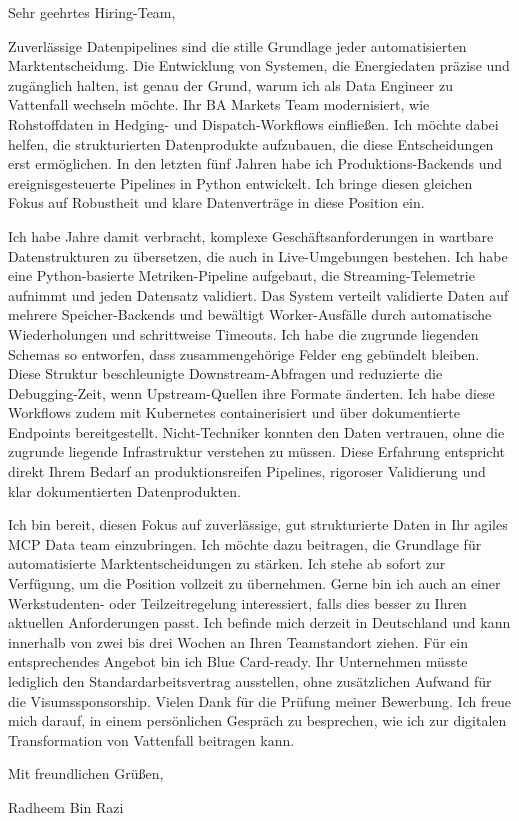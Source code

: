 \documentclass[11pt,a4paper]{coverletter}
\begin{document}

\opening{Sehr geehrtes Hiring-Team,}

Zuverlässige Datenpipelines sind die stille Grundlage jeder automatisierten Marktentscheidung. Die Entwicklung von Systemen, die Energiedaten präzise und zugänglich halten, ist genau der Grund, warum ich als Data Engineer zu Vattenfall wechseln möchte. Ihr BA Markets Team modernisiert, wie Rohstoffdaten in Hedging- und Dispatch-Workflows einfließen. Ich möchte dabei helfen, die strukturierten Datenprodukte aufzubauen, die diese Entscheidungen erst ermöglichen. In den letzten fünf Jahren habe ich Produktions-Backends und ereignisgesteuerte Pipelines in Python entwickelt. Ich bringe diesen gleichen Fokus auf Robustheit und klare Datenverträge in diese Position ein.

Ich habe Jahre damit verbracht, komplexe Geschäftsanforderungen in wartbare Datenstrukturen zu übersetzen, die auch in Live-Umgebungen bestehen. Ich habe eine Python-basierte Metriken-Pipeline aufgebaut, die Streaming-Telemetrie aufnimmt und jeden Datensatz validiert. Das System verteilt validierte Daten auf mehrere Speicher-Backends und bewältigt Worker-Ausfälle durch automatische Wiederholungen und schrittweise Timeouts. Ich habe die zugrunde liegenden Schemas so entworfen, dass zusammengehörige Felder eng gebündelt bleiben. Diese Struktur beschleunigte Downstream-Abfragen und reduzierte die Debugging-Zeit, wenn Upstream-Quellen ihre Formate änderten. Ich habe diese Workflows zudem mit Kubernetes containerisiert und über dokumentierte Endpoints bereitgestellt. Nicht-Techniker konnten den Daten vertrauen, ohne die zugrunde liegende Infrastruktur verstehen zu müssen. Diese Erfahrung entspricht direkt Ihrem Bedarf an produktionsreifen Pipelines, rigoroser Validierung und klar dokumentierten Datenprodukten.

Ich bin bereit, diesen Fokus auf zuverlässige, gut strukturierte Daten in Ihr agiles MCP Data team einzubringen. Ich möchte dazu beitragen, die Grundlage für automatisierte Marktentscheidungen zu stärken. Ich stehe ab sofort zur Verfügung, um die Position vollzeit zu übernehmen. Gerne bin ich auch an einer Werkstudenten- oder Teilzeitregelung interessiert, falls dies besser zu Ihren aktuellen Anforderungen passt. Ich befinde mich derzeit in Deutschland und kann innerhalb von zwei bis drei Wochen an Ihren Teamstandort ziehen. Für ein entsprechendes Angebot bin ich Blue Card-ready. Ihr Unternehmen müsste lediglich den Standardarbeitsvertrag ausstellen, ohne zusätzlichen Aufwand für die Visumssponsorship. Vielen Dank für die Prüfung meiner Bewerbung. Ich freue mich darauf, in einem persönlichen Gespräch zu besprechen, wie ich zur digitalen Transformation von Vattenfall beitragen kann.

\closing{Mit freundlichen Grüßen,}{Radheem Bin Razi}
\end{document}
